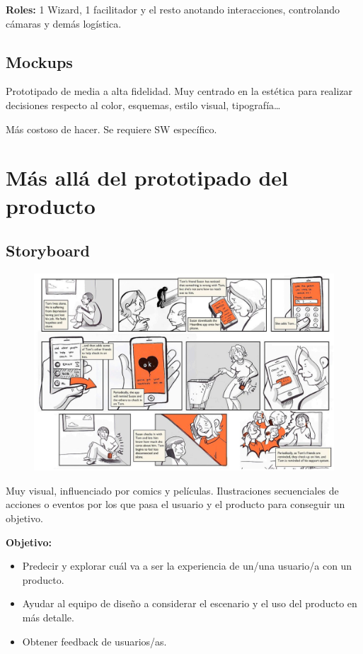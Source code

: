 \documentclass[12pt, twoside, openright]{report} %
\begin{document}
\textbf{Roles:} 1 Wizard, 1 facilitador y el resto anotando interacciones, controlando cámaras y demás logística.

\subsection{Mockups}
Prototipado de media a alta fidelidad. Muy centrado en la estética para realizar decisiones respecto al color, esquemas, estilo visual, tipografía…

Más costoso de hacer. Se requiere SW específico.

\section{Más allá del prototipado del producto}
\subsection{Storyboard}

\begin{figure}[H]
	{\includegraphics[scale=.38]{2021-03-20 23_53_31-L5.pdf - Foxit Reader.png}}
\end{figure}

Muy visual, influenciado por comics y películas. Ilustraciones secuenciales de acciones o eventos por los que pasa el usuario y el producto para conseguir un objetivo.

\textbf{Objetivo: }
\begin{itemize}
  \item Predecir y explorar cuál va a ser la experiencia de un/una usuario/a con un producto.
  \item Ayudar al equipo de diseño a considerar el escenario y el uso del producto en más detalle.
  \item Obtener feedback de usuarios/as.
\end{itemize}
\end{document}
